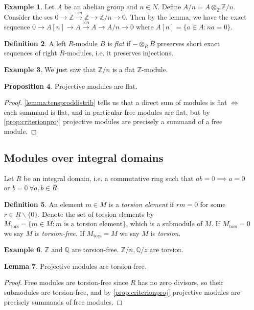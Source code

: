 \documentclass{article}
\newcommand{\Z}{\mathbb{Z}}
\newcommand{\Q}{\mathbb{Q}}
\newcommand{\tors}{{\operatorname{tors}}}
\theoremstyle{definition}
\newtheorem{defn}{Definition}[subsection]
\newtheorem{prop}[defn]{Proposition}
\newtheorem{lemma}[defn]{Lemma}
\newtheorem{example}[defn]{Example}
\begin{document}
\begin{example}
Let $A$ be an abelian group and $n\in N$. Define $A/n=A\otimes_\Z\Z/n$. Consider the ses $0\rightarrow\Z\xrightarrow{\times n}\Z\rightarrow\Z/n\rightarrow 0$. Then by the lemma, we have the exact sequence $0\rightarrow A[n]\rightarrow A\xrightarrow{\times n}A\rightarrow A/n\rightarrow 0$ where $A[n]=\{a\in A:na=0\}$.
\end{example}

\begin{defn}
A left $R$-module $B$ is \textit{flat} if $-\otimes_RB$ preserves short exact sequences of right $R$-modules, i.e. it preserves injections.
\end{defn}
\begin{example}
We just saw that $\Z/n$ is a flat $\Z$-module.
\end{example}

\begin{prop}
Projective modules are flat.
\end{prop}
\begin{proof}
\ref{lemma:tensproddistrib} tells us that a direct sum of modules is flat $\iff$ each summand is flat, and in particular free modules are flat, but by \ref{prop:criterionproj} projective modules are precisely a summand of a free module.
\end{proof}

\subsection{Modules over integral domains}
Let $R$ be an integral domain, i.e. a commutative ring such that $ab=0\implies a=0$ or $b=0 \ \forall a,b\in R$.

\begin{defn}
An element $m\in M$ is a \textit{torsion element} if $rm=0$ for some $r\in R\backslash\{0\}$. Denote the set of torsion elements by $M_\tors=\{m\in M:m\text{ is a torsion element}\}$, which is a submodule of $M$. If $M_\tors=0$ we say $M$ is \textit{torsion-free}. If $M_\tors=M$ we say $M$ is \textit{torsion}.
\end{defn}

\begin{example}
$\Z$ and $\Q$ are torsion-free. $\Z/n,\Q/z$ are torsion.
\end{example}

\begin{lemma}
Projective modules are torsion-free.
\end{lemma}
\begin{proof}
Free modules are torsion-free since $R$ has no zero divisors, so their submodules are torsion-free, and by \ref{prop:criterionproj} projective modules are precisely summands of free modules.
\end{proof}
\end{document}
